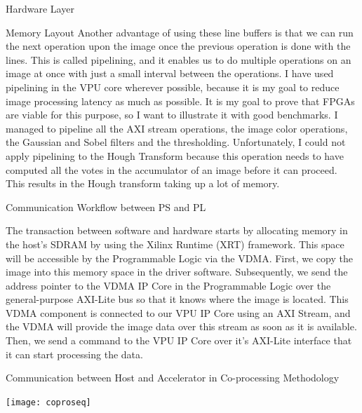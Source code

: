 \documentclass{matthijs}
\begin{document}
\begin{hoofdstuk}{Hardware Layer}
\begin{paragraaf}{Memory Layout}
			Another advantage of using these line buffers is that we can run the next operation upon the image once the previous operation is done with the lines.
			This is called pipelining, and it enables us to do multiple operations on an image at once with just a small interval between the operations.
			I have used pipelining in the VPU core wherever possible, because it is my goal to reduce image processing latency as much as possible.
			It is my goal to prove that FPGAs are viable for this purpose, so I want to illustrate it with good benchmarks.
			I managed to pipeline all the AXI stream operations, the image color operations, the Gaussian and Sobel filters and the thresholding.
			Unfortunately, I could not apply pipelining to the Hough Transform because this operation needs to have computed all the votes in the accumulator of an image before it can proceed.
			This results in the Hough transform taking up a lot of memory.

		\end{paragraaf}

		\begin{paragraaf}{Communication Workflow between PS and PL}
			
			The transaction between software and hardware starts by allocating memory in the host's SDRAM by using the Xilinx Runtime (XRT) framework.
			This space will be accessible by the Programmable Logic via the VDMA.
			First, we copy the image into this memory space in the driver software.
			Subsequently, we send the address pointer to the VDMA IP Core in the Programmable Logic over the general-purpose AXI-Lite bus so that it knows where the image is located.
			This VDMA component is connected to our VPU IP Core using an AXI Stream, and the VDMA will provide the image data over this stream as soon as it is available.
			Then, we send a command to the VPU IP Core over it's AXI-Lite interface that it can start processing the data.

			\vspace{-0.6ex}
			\begin{figuur}{Communication between Host and Accelerator in Co-processing Methodology}
				\singlespacing
				\begin{adjustbox}{width=\textwidth,center}
					\texttt{[image: coproseq]}
				\end{adjustbox}
				\onehalfspacing
				\vspace{-2ex}
			\end{figuur}
			\vspace{-0.2ex}


\end{paragraaf}
\end{hoofdstuk}
\end{document}
